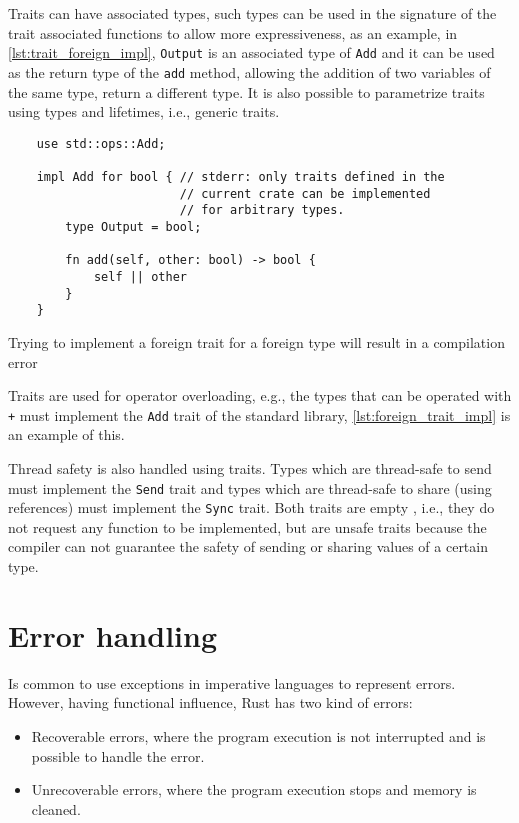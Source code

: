 Traits can have associated types, such types can be used in the signature of the trait associated functions to allow more expressiveness, as an example, in \ref{lst:trait_foreign_impl}, \texttt{Output} is an associated type of \texttt{Add} and it can be used as the return type of the \texttt{add} method, allowing the addition of two variables of the same type, return a different type. It is also possible to parametrize traits using types and lifetimes, i.e., generic traits.

\begin{listing}[h]
	\begin{verbatim}
    use std::ops::Add;

    impl Add for bool { // stderr: only traits defined in the
                        // current crate can be implemented 
                        // for arbitrary types.
        type Output = bool;
        
        fn add(self, other: bool) -> bool {
            self || other
        }
    }
    \end{verbatim}
  \caption{Trying to implement a foreign trait for a foreign type will result in a compilation error}
  \label{lst:foreign_trait_foreign_impl}
\end{listing}

Traits are used for operator overloading, e.g., the types that can be operated with \texttt{+} must implement the \texttt{Add} trait of the standard library, \ref{lst:foreign_trait_impl} is an example of this. 

Thread safety is also handled using traits. Types which are thread-safe to send must implement the \texttt{Send} trait and types which are thread-safe to share (using references) must implement the \texttt{Sync} trait. Both traits are empty , i.e., they do not request any function to be implemented, but are unsafe traits because the compiler can not guarantee the safety of sending or sharing values of a certain type.

\section{Error handling}
Is common to use exceptions in imperative languages to represent errors. However, having functional influence, Rust has two kind of errors: 
\begin{itemize}
    \item Recoverable errors, where the program execution is not interrupted and is possible to handle the error.
    \item Unrecoverable errors, where the program execution stops and memory is cleaned.
\end{itemize}

